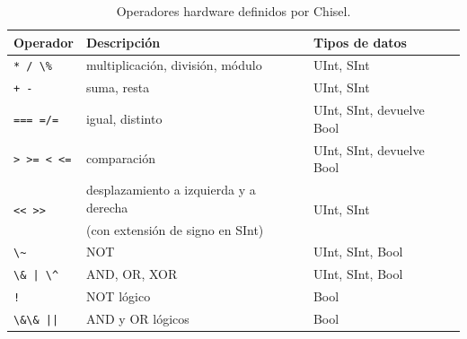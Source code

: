 \documentclass[%
    10pt,
    headinclude, footinclude=false,
    openright, %
    notitlepage,
    cleardoublepage=empty,
    headsepline,
    numbers=noenddot,
    bibliography=totoc, index=totoc,
    ]{scrbook}
\newcommand{\code}[1]{{\lstinline[basicstyle=\small\ttfamily]{#1}}}
\begin{document}
\begin{table}[h]
 \centering
 \renewcommand{\arraystretch}{1.3}
  \begin{tabular}{lll}
    \toprule
    Operador & Descripción & Tipos de datos \\
    \midrule
    \code{* / \%} & multiplicación, división, módulo & UInt, SInt \\
    \code{+ -} & suma, resta & UInt, SInt \\
    \code{=== =/=} & igual, distinto & UInt, SInt, devuelve Bool \\
    \code{> >= < <=} & comparación & UInt, SInt, devuelve Bool \\
    \multirow{2}{*}{\code{<< >>}} & desplazamiento a izquierda y a derecha & \multirow{2}{*}{UInt, SInt} \\
     & (con extensión de signo en SInt) & \\
    \code{\~} & NOT & UInt, SInt, Bool \\
    \code{\& | \^} & AND, OR, XOR & UInt, SInt, Bool \\
    \code{!} & NOT lógico & Bool \\
    \code{\&\& ||} & AND y OR lógicos & Bool \\
    \bottomrule
  \end{tabular}
  \caption{Operadores hardware definidos por Chisel.}
 \label{tab:operators}
\end{table}


\end{document}
